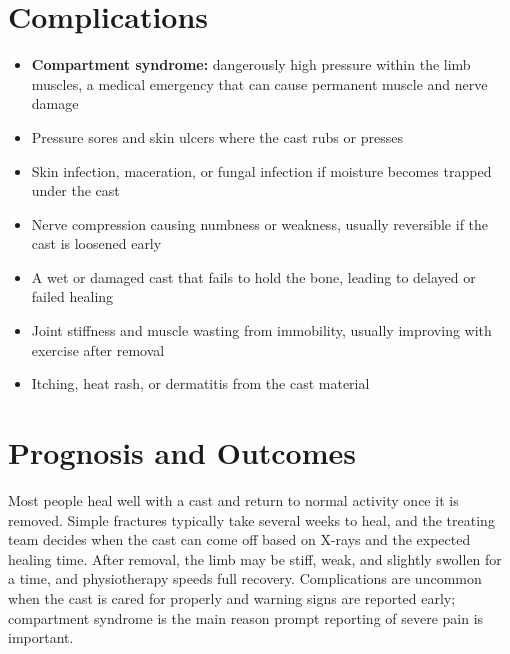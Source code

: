 \section*{Complications}
\begin{itemize}
    \item \textbf{Compartment syndrome:} dangerously high pressure within the limb muscles, a medical emergency that can cause permanent muscle and nerve damage
    \item Pressure sores and skin ulcers where the cast rubs or presses
    \item Skin infection, maceration, or fungal infection if moisture becomes trapped under the cast
    \item Nerve compression causing numbness or weakness, usually reversible if the cast is loosened early
    \item A wet or damaged cast that fails to hold the bone, leading to delayed or failed healing
    \item Joint stiffness and muscle wasting from immobility, usually improving with exercise after removal
    \item Itching, heat rash, or dermatitis from the cast material
\end{itemize}

\section*{Prognosis and Outcomes}
Most people heal well with a cast and return to normal activity once it is removed. Simple fractures typically take several weeks to heal, and the treating team decides when the cast can come off based on X-rays and the expected healing time. After removal, the limb may be stiff, weak, and slightly swollen for a time, and physiotherapy speeds full recovery. Complications are uncommon when the cast is cared for properly and warning signs are reported early; compartment syndrome is the main reason prompt reporting of severe pain is important.

